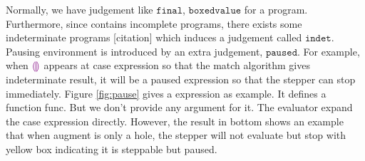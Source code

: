Normally, we have judgement like $\mathtt{final}$, $\mathtt{boxedvalue}$ for a program. Furthermore, since \Hazel contains incomplete programs, there exists some indeterminate programs [citation] which induces a judgement called $\mathtt{indet}$. Pausing environment is introduced by an extra judgement, $\mathtt{paused}$. For example, when $\textcolor{violet}{\llparenthesis}\textcolor{violet}{\rrparenthesis}$ appears at case expression so that the match algorithm gives indeterminate result, it will be a paused expression so that the stepper can stop immediately. Figure \ref{fig:pause} gives a expression as example. It defines a function func. But we don't provide any argument for it. The evaluator expand the case expression directly. However, the result in bottom shows an example that when augment is only a hole, the stepper will not evaluate but stop with yellow box indicating it is steppable but paused.

